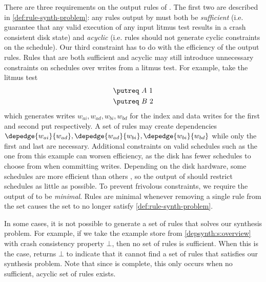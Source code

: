 There are three requirements on the output rules of \depsynth.
The first two are described in \autoref{def:rule-synth-problem}: any rules output by \depsynth
must both be \textit{sufficient} (i.e. guarantee that any valid execution of any input litmus test
results in a crash consistent disk state)
and \textit{acyclic} (i.e. rules should not generate cyclic constraints on the schedule).
Our third constraint has to do with the efficiency of the output rules.
Rules that are both sufficient and acyclic may still introduce unnecessary constraints
on schedules over writes from a litmus test.
For example, take the litmus test
\begin{align*}
  &\putreq\ A\ 1\\
  &\putreq\ B\ 2
\end{align*}
which generates writes $w_{ai}, w_{ad}, w_{bi}, w_{bd}$ for the index and data writes
for the first and second put respectively.
A set of rules may create dependencies
$\depedge{w_{ai}}{w_{ad}}, \depedge{w_{ad}}{w_{bi}}, \depedge{w_{bi}}{w_{bd}}$
while only the first and last are necessary.
Additional constraints on valid schedules such as the one from this example can worsen
efficiency, as the disk has fewer schedules to choose from when committing writes.
Depending on the disk hardware, some schedules are more efficient than others ,
so the output of \depsynth should restrict schedules as little as possible.
To prevent frivolous constraints, we require the output of \depsynth to be
\textit{minimal}. Rules are minimal whenever removing a single rule from the set
causes the set to no longer satisfy \autoref{def:rule-synth-problem}.

In some cases, it is not possible to generate a set of rules that solves our
synthesis problem. For example, if we take the example store from \autoref{depsynth:s:overview}
with crash consistency property $\bot$, then no set of rules is sufficient.
When this is the case, \depsynth returns $\bot$ to indicate that it cannot find
a set of rules that satisfies our synthesis problem. Note that since \depsynth
is complete, this only occurs when no sufficient, acyclic set of rules exists.


